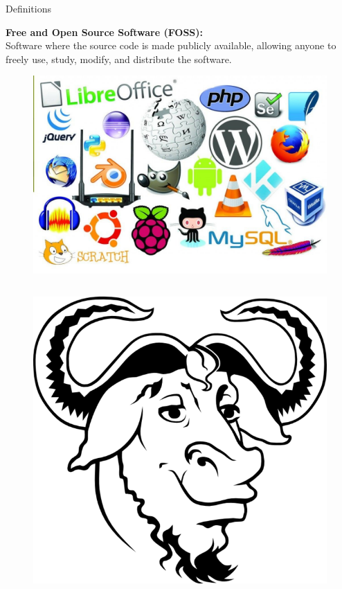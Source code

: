 \documentclass[9pt, dvipsnames]{beamer}
\begin{document}
\begin{frame}{Definitions}
     {
        \textbf{Free and Open Source Software (FOSS):} \\ Software where the
        source code is made publicly available, allowing anyone to freely use,
        study, modify, and distribute the software.
        \begin{center}
            \begin{figure}
                \centering
                \includegraphics[width=0.7\linewidth]{assets/foss.jpeg}
            \end{figure}
        \end{center}
    }
     {
        \begin{columns}[t]
            \begin{column}{0.5\textwidth}
                \begin{figure}
                    \centering
                    \includegraphics[height=0.2\paperheight]{assets/GNU.png}

\end{figure}
\end{column}
\end{columns}}
\end{frame}
\end{document}
